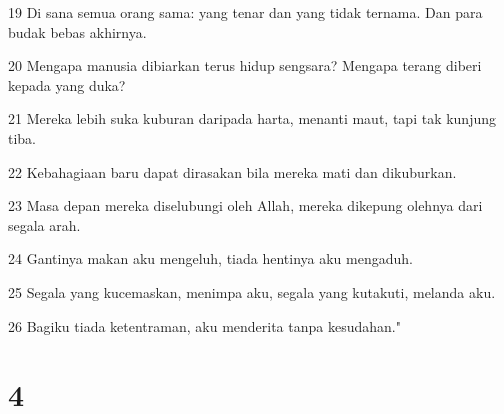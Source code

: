 \par 19 Di sana semua orang sama: yang tenar dan yang tidak ternama. Dan para budak bebas akhirnya.
\par 20 Mengapa manusia dibiarkan terus hidup sengsara? Mengapa terang diberi kepada yang duka?
\par 21 Mereka lebih suka kuburan daripada harta, menanti maut, tapi tak kunjung tiba.
\par 22 Kebahagiaan baru dapat dirasakan bila mereka mati dan dikuburkan.
\par 23 Masa depan mereka diselubungi oleh Allah, mereka dikepung olehnya dari segala arah.
\par 24 Gantinya makan aku mengeluh, tiada hentinya aku mengaduh.
\par 25 Segala yang kucemaskan, menimpa aku, segala yang kutakuti, melanda aku.
\par 26 Bagiku tiada ketentraman, aku menderita tanpa kesudahan."

\chapter{4}

